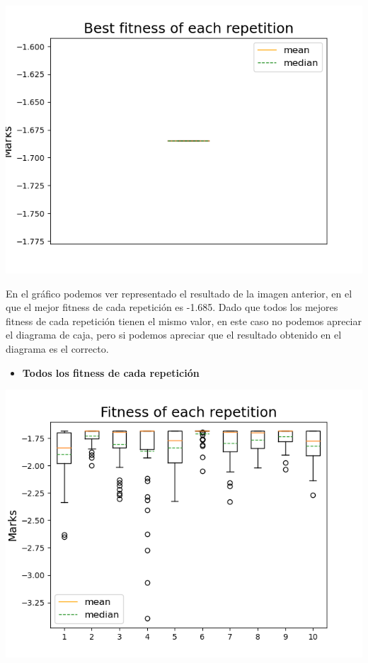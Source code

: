 \documentclass[11pt, a4paper, titlepage]{article}
\begin{document}
\includegraphics[scale=0.6]{img/grafica1_horinsuf}


En el gráfico podemos ver representado el resultado de la imagen anterior, en el que el mejor fitness de cada repetición es -1.685. Dado que todos los mejores fitness de cada repetición tienen el mismo valor, en este caso no podemos apreciar el diagrama de caja, pero si podemos apreciar que el resultado obtenido en el diagrama es el correcto.

\vspace{5mm}

\begin{itemize}
\item \textbf{Todos los fitness de cada repetición}
\end{itemize}

\includegraphics[scale=0.6]{img/grafica2_horinsuf}
\end{document}

